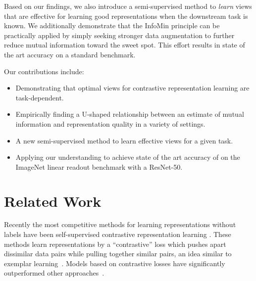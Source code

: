 \documentclass{article}
\begin{document}
Based on our findings, we also introduce a semi-supervised method to \emph{learn} views that are effective for learning good representations when the downstream task is known. We additionally demonstrate that the InfoMin principle can be practically applied by simply seeking stronger data augmentation to further reduce mutual information toward the sweet spot. This effort results in state of the art accuracy on a standard benchmark. 

Our contributions include:
\begin{itemize}[leftmargin=5.5mm]
    \item Demonstrating that optimal views for contrastive representation learning are task-dependent.
    \item Empirically finding a U-shaped relationship between an estimate of mutual information and representation quality in a variety of settings.
    \item A new semi-supervised method to learn effective views for a given task.
    \item Applying our understanding to achieve state of the art accuracy of  on the ImageNet linear readout benchmark with a ResNet-50. 
\end{itemize}




 
\section{Related Work}
Recently the most competitive methods for learning representations without labels have been self-supervised contrastive representation learning  \cite{oord2018representation,hjelm2018learning,wu2018unsupervised,tian2019contrastive,sohn2016improved,chen2020simple}. 
These methods learn representations by a ``contrastive'' loss which pushes apart dissimilar data pairs while pulling together similar pairs, an idea similar to exemplar learning~\cite{dosovitskiy2014discriminative}.
Models based on contrastive losses have significantly outperformed other approaches~\cite{zhang2017split,kingma2013auto,pathak2016context,tian2019contrastive,donahue2019large,noroozi2016unsupervised,doersch2015unsupervised,gidaris2018unsupervised,zhang2019aet}.
\end{document}
